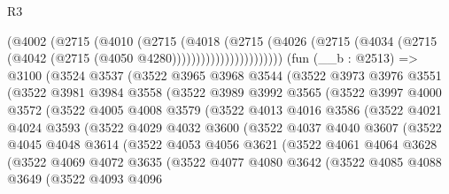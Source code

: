 \begin{lexlean}{R3}
\begin{coremodule}
                        (@4002
                          (@2715
                            (@4010
                              (@2715
                                (@4018
                                  (@2715
                                    (@4026
                                      (@2715
                                        (@4034
                                          (@2715 (@4042 (@2715 (@4050 @4280)))))))))))))))))))))))
    (fun (__b : @2513) =>
    @3100
      (@3524
        @3537
        (@3522
          @3965
          @3968
          @3544
          (@3522
            @3973
            @3976
            @3551
            (@3522
              @3981
              @3984
              @3558
              (@3522
                @3989
                @3992
                @3565
                (@3522
                  @3997
                  @4000
                  @3572
                  (@3522
                    @4005
                    @4008
                    @3579
                    (@3522
                      @4013
                      @4016
                      @3586
                      (@3522
                        @4021
                        @4024
                        @3593
                        (@3522
                          @4029
                          @4032
                          @3600
                          (@3522
                            @4037
                            @4040
                            @3607
                            (@3522
                              @4045
                              @4048
                              @3614
                              (@3522
                                @4053
                                @4056
                                @3621
                                (@3522
                                  @4061
                                  @4064
                                  @3628
                                  (@3522
                                    @4069
                                    @4072
                                    @3635
                                    (@3522
                                      @4077
                                      @4080
                                      @3642
                                      (@3522
                                        @4085
                                        @4088
                                        @3649
                                        (@3522
                                          @4093
                                          @4096

\end{coremodule}
\end{lexlean}
